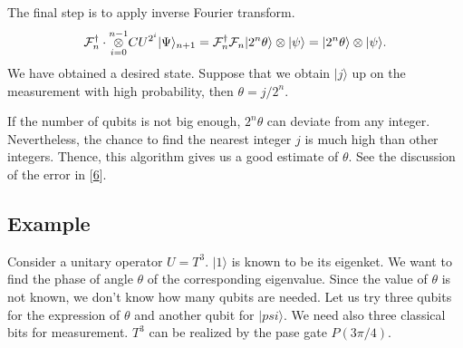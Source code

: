 \documentclass[letterpaper,10pt,english]{jupyterBook}
\begin{document}
\sphinxAtStartPar
The final step is to apply inverse Fourier transform.
\begin{equation*}
\begin{split}
\mathcal{F}^\dagger_{n} \cdot \overset{n-1}{\underset{i=0}{\Large\otimes}} CU^{2^i} |\Psi\rangle_{n+1} = \mathcal{F}^\dagger _{n} \mathcal{F}_{n} |2^n \theta\rangle \otimes |\psi\rangle =  |2^n \theta\rangle \otimes |\psi\rangle.
\end{split}
\end{equation*}
\sphinxAtStartPar
We have obtained a desired state.  Suppose that we obtain \(|j\rangle\) up on the measurement with high probability, then \(\theta = j/2^n\).

\sphinxAtStartPar
If the number of qubits is not big enough, \(2^n \theta\) can deviate from any integer.  Nevertheless, the chance to find the nearest integer \(j\) is much high than other integers.  Thence, this algorithm gives us a good estimate of \(\theta\).  See the discussion of the error in {[}\hyperlink{cite.references:id5}{6}{]}.


\subsection{Example}
\label{\detokenize{algorithms/qpe:example}}
\sphinxAtStartPar
Consider a unitary operator \(U = T^3\). \(|1\rangle\) is known to be its eigenket.  We want to find the phase of angle \(\theta\) of the corresponding eigenvalue.  Since the value of \(\theta\) is not known, we don’t know how many qubits are needed.  Let us try three qubits for the expression of \(\theta\) and another qubit for \(|psi\rangle\).  We need also three classical bits for measurement. \(T^3\) can be realized by the pase gate \(P(3\pi/4)\).
\end{document}
